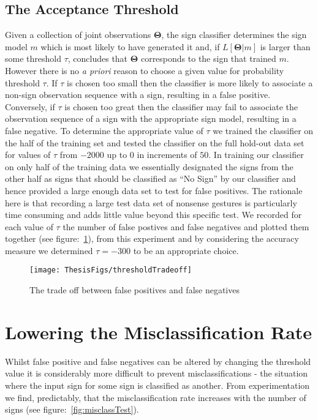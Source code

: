 \subsection{The Acceptance Threshold}
Given a collection of joint observations $\bm{\Theta}$, the sign classifier determines the sign model $m$ which is most likely to have generated it and, if $L[\bm{\Theta}|m]$ is larger than some threshold $\tau$, concludes that $\bm{\Theta}$ corresponds to the sign that trained $m$. However there is no \emph{a priori} reason to choose a given value for probability threshold $\tau$. If $\tau$ is chosen too small then the classifier is more likely to associate a non-sign observation sequence with a sign, resulting in a false positive. Conversely, if $\tau$ is chosen too great then the classifier may fail to associate the observation sequence of a sign with the appropriate sign model, resulting in a false negative. To determine the appropriate value of $\tau$ we trained the classifier on the half of the training set and tested the classifier on the full hold-out data set for values of $\tau$ from $-2000$ up to $0$ in increments of $50$. In training our classifier on only half of the training data we essentially designated the signs from the other half as signs that should be classified as ``No Sign'' by our classifier and hence provided a large enough data set to test for false positives. The rationale here is that recording a large test data set of nonsense gestures is particularly time consuming and adds little value beyond this specific test. We recorded for each value of $\tau$ the number of false postives and false negatives and plotted them together (see figure:~\ref{fig:tradeOff}), from this experiment and by considering the accuracy measure we determined $\tau = -300$ to be an appropriate choice. 

\begin{figure}[t]
        \centering
        \texttt{[image: ThesisFigs/thresholdTradeoff]}
        \caption{The trade off between false positives and false negatives}\label{fig:tradeOff}
\end{figure}

\section{Lowering the Misclassification Rate}
Whilst false positive and false negatives can be altered by changing the threshold value it is considerably more difficult to prevent misclassifications - the situation where the input sign for some sign is classified as another. From experimentation we find, predictably, that the misclassification rate increases with the number of signs (see figure:~\ref{fig:misclassTest}).

